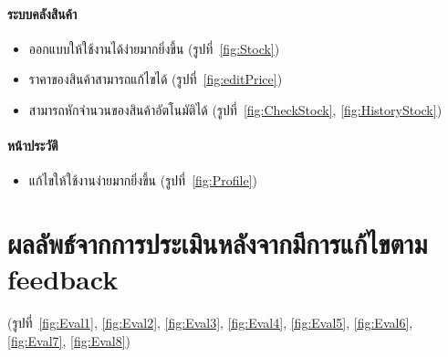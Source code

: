 \paragraph{ระบบคลังสินค้า}
\begin{itemize}
    \item ออกแบบให้ใช้งานได้ง่ายมากยิ่งขึ้น (รูปที่~\ref{fig:Stock})
    \item ราคาของสินค้าสามารถแก้ไขได้ (รูปที่~\ref{fig:editPrice})
    \item สามารถหักจำนวนของสินค้าอัตโนมัติได้ (รูปที่~\ref{fig:CheckStock}, \ref{fig:HistoryStock})
\end{itemize}
\paragraph{หน้าประวัติ}
\begin{itemize}
    \item แก้ไขให้ใช้งานง่ายมากยิ่งขึ้น (รูปที่~\ref{fig:Profile})
\end{itemize}

\section{ผลลัพธ์จากการประเมินหลังจากมีการแก้ไขตาม feedback}
(รูปที่~\ref{fig:Eval1}, \ref{fig:Eval2}, \ref{fig:Eval3}, \ref{fig:Eval4}, \ref{fig:Eval5}, \ref{fig:Eval6}, \ref{fig:Eval7}, \ref{fig:Eval8})

